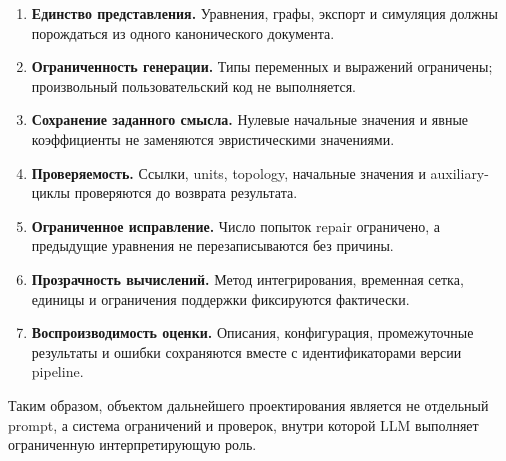 \begin{enumerate}
    \item \textbf{Единство представления.} Уравнения, графы, экспорт и симуляция должны порождаться из одного канонического документа.
    \item \textbf{Ограниченность генерации.} Типы переменных и выражений ограничены; произвольный пользовательский код не выполняется.
    \item \textbf{Сохранение заданного смысла.} Нулевые начальные значения и явные коэффициенты не заменяются эвристическими значениями.
    \item \textbf{Проверяемость.} Ссылки, units, topology, начальные значения и auxiliary-циклы проверяются до возврата результата.
    \item \textbf{Ограниченное исправление.} Число попыток repair ограничено, а предыдущие уравнения не перезаписываются без причины.
    \item \textbf{Прозрачность вычислений.} Метод интегрирования, временная сетка, единицы и ограничения поддержки фиксируются фактически.
    \item \textbf{Воспроизводимость оценки.} Описания, конфигурация, промежуточные результаты и ошибки сохраняются вместе с идентификаторами версии pipeline.
\end{enumerate}

Таким образом, объектом дальнейшего проектирования является не отдельный prompt, а система ограничений и проверок, внутри которой LLM выполняет ограниченную интерпретирующую роль.
